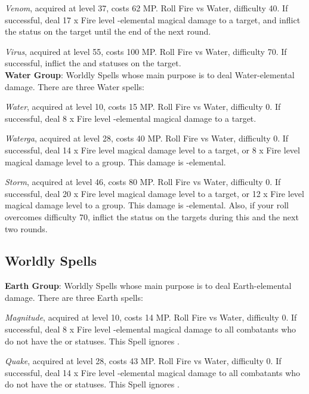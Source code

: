 \begin{multicols}{2}
    \textit{Venom}, acquired at level 37, costs 62 MP\@. Roll Fire vs Water, difficulty 40. If successful, deal 17 x Fire level -elemental magical damage to a target, and inflict the  status on the target until the end of the next round.
    
    \textit{Virus}, acquired at level 55, costs 100 MP\@. Roll Fire vs Water, difficulty 70. If successful, inflict the  and  statuses on the target.\\%
    
    \textbf{Water Group}: Worldly Spells whose main purpose is to deal Water-elemental damage. There are three Water spells:
    
    \textit{Water}, acquired at level 10, costs 15 MP\@. Roll Fire vs Water, difficulty 0. If successful, deal 8 x Fire level -elemental magical damage to a target.
    
    \textit{Waterga}, acquired at level 28, costs 40 MP\@. Roll Fire vs Water, difficulty 0. If successful, deal 14 x Fire level magical damage level to a target, or 8 x Fire level magical damage level to a group. This damage is -elemental.
    
    \textit{Storm}, acquired at level 46, costs 80 MP\@. Roll Fire vs Water, difficulty 0. If successful, deal 20 x Fire level magical damage level to a target, or 12 x Fire level magical damage level to a group. This damage is -elemental. Also, if your roll overcomes difficulty 70, inflict the  status on the targets during this and the next two rounds.
    
    \subsection{Worldly Spells}\label{subsec:black-worldly}

    \textbf{Earth Group}: Worldly Spells whose main purpose is to deal Earth-elemental damage. There are three Earth spells:
    
    \textit{Magnitude}, acquired at level 10, costs 14 MP\@. Roll Fire vs Water, difficulty 0. If successful, deal 8 x Fire level -elemental magical damage to all combatants who do not have the  or  statuses. This Spell ignores .
    
    \textit{Quake}, acquired at level 28, costs 43 MP\@. Roll Fire vs Water, difficulty 0. If successful, deal 14 x Fire level -elemental magical damage to all combatants who do not have the  or  statuses. This Spell ignores .
    

\end{multicols}
